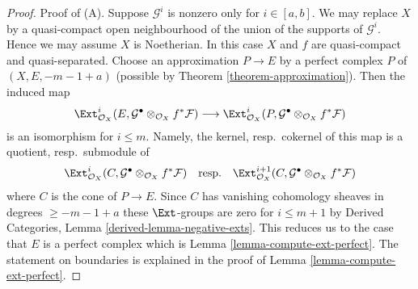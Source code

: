 \begin{proof}
Proof of (A). Suppose $\mathcal{G}^i$ is nonzero only for $i \in [a, b]$.
We may replace $X$ by a quasi-compact open neighbourhood of the union
of the supports of $\mathcal{G}^i$. Hence we may assume $X$ is Noetherian.
In this case $X$ and $f$ are quasi-compact and quasi-separated.
Choose an approximation $P \to E$ by a perfect complex $P$ of
$(X, E, -m - 1 + a)$
(possible by Theorem \ref{theorem-approximation}).
Then the induced map
$$
\Ext^i_{\mathcal{O}_X}(E,
\mathcal{G}^\bullet \otimes_{\mathcal{O}_X} f^*\mathcal{F})
\longrightarrow
\Ext^i_{\mathcal{O}_X}(P,
\mathcal{G}^\bullet \otimes_{\mathcal{O}_X} f^*\mathcal{F})
$$
is an isomorphism for $i \leq m$. Namely, the kernel, resp.\ cokernel of this
map is a quotient, resp.\ submodule of
$$
\Ext^i_{\mathcal{O}_X}(C,
\mathcal{G}^\bullet \otimes_{\mathcal{O}_X} f^*\mathcal{F})
\quad\text{resp.}\quad
\Ext^{i + 1}_{\mathcal{O}_X}(C,
\mathcal{G}^\bullet \otimes_{\mathcal{O}_X} f^*\mathcal{F})
$$
where $C$ is the cone of $P \to E$. Since $C$ has vanishing cohomology
sheaves in degrees $\geq -m - 1 + a$ these $\Ext$-groups are zero
for $i \leq m + 1$ by
Derived Categories, Lemma \ref{derived-lemma-negative-exts}.
This reduces us to the case that
$E$ is a perfect complex which is Lemma \ref{lemma-compute-ext-perfect}.
The statement on boundaries is explained in the proof of
Lemma \ref{lemma-compute-ext-perfect}.


\end{proof}
